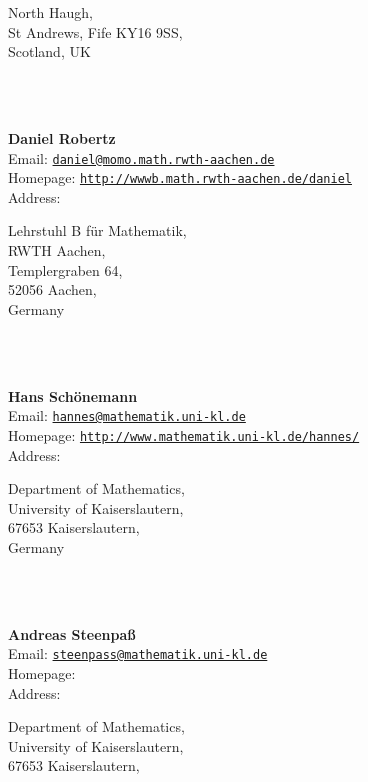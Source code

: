 \documentclass[a4paper,11pt]{report}
\begin{document}
\begin{titlepage}
{\begin{minipage}[t]{8cm}
 North Haugh, \\
 St Andrews, Fife KY16 9SS, \\
 Scotland, UK \end{minipage}
}\\
{\mbox{}\\
\small \noindent \textbf{Daniel Robertz\\
    }  Email: \href{mailto://daniel@momo.math.rwth-aachen.de} {\texttt{daniel@momo.math.rwth-aachen.de}}\\
  Homepage: \href{http://wwwb.math.rwth-aachen.de/~daniel} {\texttt{http://wwwb.math.rwth-aachen.de/\texttt{}daniel}}\\
  Address: \begin{minipage}[t]{8cm}\noindent
 Lehrstuhl B f{\"u}r Mathematik, \\
 RWTH Aachen, \\
 Templergraben 64, \\
 52056 Aachen, \\
 Germany \end{minipage}
}\\
{\mbox{}\\
\small \noindent \textbf{Hans Sch{\"o}nemann\\
    }  Email: \href{mailto://hannes@mathematik.uni-kl.de} {\texttt{hannes@mathematik.uni-kl.de}}\\
  Homepage: \href{http://www.mathematik.uni-kl.de/~hannes/} {\texttt{http://www.mathematik.uni-kl.de/\texttt{}hannes/}}\\
  Address: \begin{minipage}[t]{8cm}\noindent
 Department of Mathematics, \\
 University of Kaiserslautern, \\
 67653 Kaiserslautern, \\
 Germany \end{minipage}
}\\
{\mbox{}\\
\small \noindent \textbf{Andreas Steenpa{\ss}\\
    }  Email: \href{mailto://steenpass@mathematik.uni-kl.de} {\texttt{steenpass@mathematik.uni-kl.de}}\\
  Homepage: \href{} {\texttt{}}\\
  Address: \begin{minipage}[t]{8cm}\noindent
 Department of Mathematics, \\
 University of Kaiserslautern, \\
 67653 Kaiserslautern, \\

\end{minipage}}
\end{titlepage}
\end{document}

